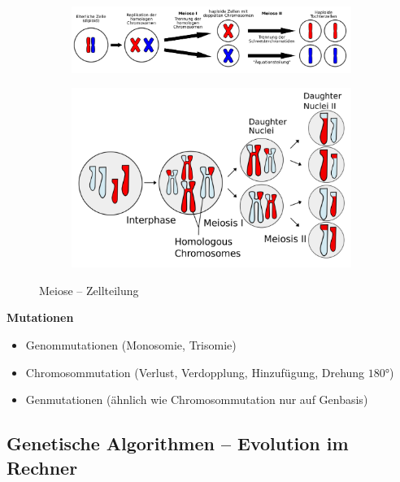%
\begin{figure}
	\centering
	\begin{subfigure}{\textwidth}
	\centering
	\includegraphics[width=\textwidth]{figures/meiose.png}
	\end{subfigure}
	\begin{subfigure}{.6\textwidth}
	\centering
	\includegraphics[width=\textwidth]{figures/meiose_1.png}
	\end{subfigure}
	\caption{Meiose -- Zellteilung}
\end{figure}
%
\textbf{Mutationen}
\begin{itemize}
	\item Genommutationen (Monosomie, Trisomie)
	\item Chromosommutation (Verlust, Verdopplung, Hinzufügung, Drehung $180°$)
	\item Genmutationen (ähnlich wie Chromosommutation nur auf Genbasis)
\end{itemize}

\subsection{Genetische Algorithmen -- \glqq Evolution im Rechner\grqq}

